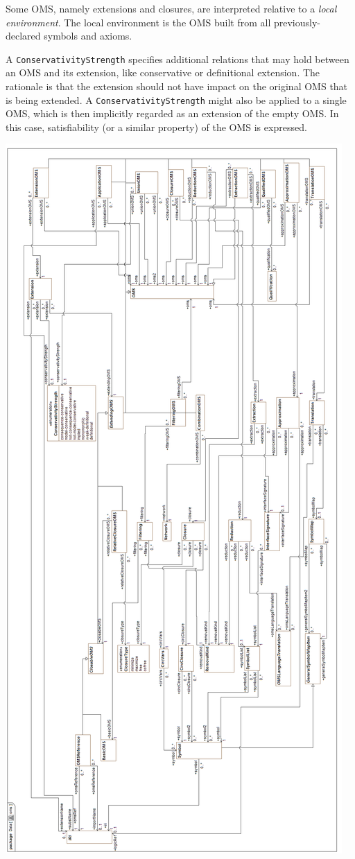\documentclass[10pt,fleqn,final]{scrreprt}
\newcommand{\cbs}[0]{\color{red}\xspace} %
\newcommand{\cbe}[0]{\color{black}\xspace} %
\newcommand*{\syntax}[1]{\texttt{#1}}
\newenvironment{definitions}[0]{\medskip }{}
\begin{document}
\begin{definitions}
\cbs
Some OMS, namely extensions and \cbs closures\cbe{}, are interpreted relative to a \emph{local environment}.
The local environment is the OMS built from all
previously-declared symbols and axioms.

A \syntax{ConservativityStrength} specifies additional relations that may hold
between an OMS and its extension, like conservative or definitional
extension. The rationale is that the extension should not have impact
on the original OMS that is being extended. A \syntax{ConservativityStrength}
might also be applied to a single OMS, which is then implicitly
regarded as an extension of the empty OMS. In this case,
satisfiability (or a similar property) of the OMS is expressed.
\cbe

\medskip
\begin{center}
\includegraphics[height=\textheight]{mof/Class_Diagram__oms.png}

\end{center}
\end{definitions}
\end{document}
